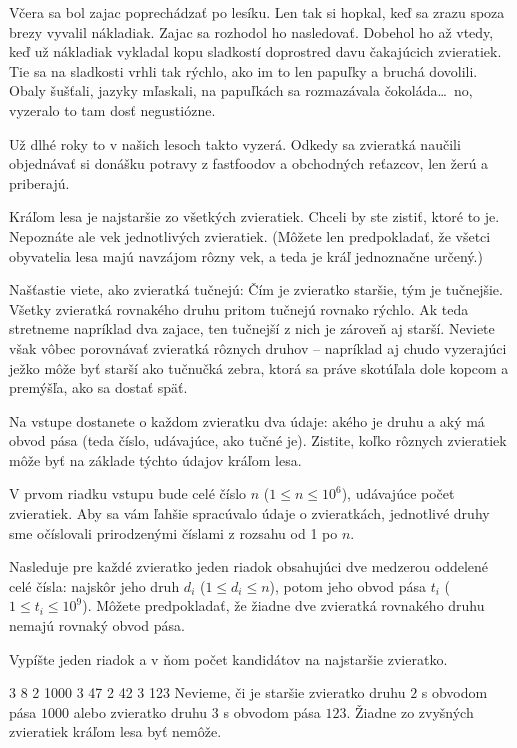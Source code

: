 




Včera sa bol zajac poprechádzať po lesíku. Len tak si hopkal, keď sa zrazu spoza
brezy vyvalil nákladiak. Zajac sa rozhodol ho nasledovať. Dobehol ho až vtedy, keď už nákladiak
vykladal kopu sladkostí doprostred davu čakajúcich zvieratiek.
Tie sa na sladkosti vrhli tak rýchlo, ako im to len papuľky a bruchá dovolili.
Obaly šušťali, jazyky mľaskali, na papuľkách sa rozmazávala čokoláda\dots\ no, vyzeralo to
tam dosť negustiózne.

Už dlhé roky to v našich lesoch takto vyzerá. Odkedy sa zvieratká naučili objednávať si donášku
potravy z fastfoodov a obchodných reťazcov, len žerú a priberajú.


Kráľom lesa je najstaršie zo všetkých zvieratiek. Chceli by ste zistiť, ktoré to je.
Nepoznáte ale vek jednotlivých zvieratiek.
(Môžete len predpokladať, že všetci obyvatelia lesa majú navzájom rôzny vek, a teda je kráľ
jednoznačne určený.)

Našťastie viete, ako zvieratká tučnejú:
Čím je zvieratko staršie, tým je tučnejšie.
Všetky zvieratká rovnakého druhu pritom tučnejú rovnako rýchlo. Ak teda stretneme napríklad
dva zajace, ten tučnejší z nich je zároveň aj starší. Neviete však vôbec porovnávať zvieratká rôznych
druhov -- napríklad aj chudo vyzerajúci ježko môže byť starší ako tučnučká zebra, ktorá sa práve
skotúľala dole kopcom a premýšľa, ako sa dostať späť.

Na vstupe dostanete o každom zvieratku dva údaje: akého je druhu a aký má obvod pása (teda číslo, udávajúce, ako tučné je).
Zistite, koľko rôznych zvieratiek môže byť na základe týchto údajov kráľom lesa.




V prvom riadku vstupu bude celé číslo $n$ ($1\leq n\leq 10^6$), udávajúce počet zvieratiek.
Aby sa vám ľahšie spracúvalo údaje o zvieratkách, jednotlivé druhy sme očíslovali prirodzenými
číslami z rozsahu od 1 po $n$.

Nasleduje pre každé zvieratko jeden riadok obsahujúci dve medzerou oddelené celé čísla:
najskôr jeho druh $d_i$ ($1\leq d_i\leq n$), potom jeho obvod pása $t_i$ ($1\leq t_i\leq 10^9$).
Môžete predpokladať, že žiadne dve zvieratká rovnakého druhu nemajú rovnaký obvod pása.


Vypíšte jeden riadok a v ňom počet kandidátov na najstaršie zvieratko.


3 8
2 1000
3 47
2 42
3 123
\komentar
Nevieme, či je staršie zvieratko druhu $2$ s obvodom pása $1000$ alebo zvieratko druhu $3$ s obvodom
pása $123$. Žiadne zo zvyšných zvieratiek kráľom lesa byť nemôže.
\koniec


